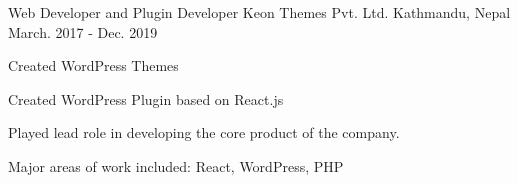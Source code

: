 
\begin{cventries}
  \cventry
    {Web Developer and Plugin Developer } %
    {Keon Themes Pvt. Ltd.} %
    {Kathmandu, Nepal} %
    {March. 2017 - Dec. 2019} %
    {
      \begin{cvitems} %
        \item {Created WordPress Themes}
        \item {Created WordPress Plugin based on React.js  }
        \item {Played lead role in developing the core product of the company.}
        \item {Major areas of work included: React, WordPress, PHP}
      \end{cvitems}
    }
\end{cventries}
